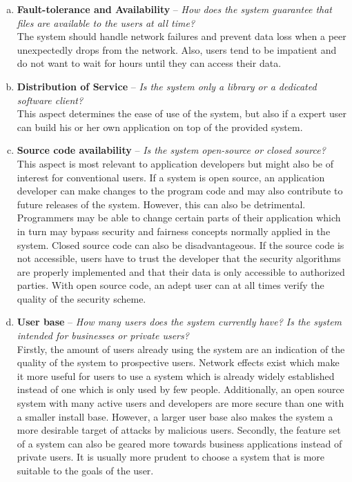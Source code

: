 \begin{enumerate}[(a)]
\item \textbf{Fault-tolerance and Availability} -- \textit{How does the system guarantee that files are available to the users at all time?}\\
The system should handle network failures and prevent data loss when a peer unexpectedly drops from the network. Also, users tend to be impatient and do not want to wait for hours until they can access their data.

\item \textbf{Distribution of Service} -- \textit{Is the system only a library or a dedicated software client?}\\
This aspect determines the ease of use of the system, but also if a expert user can build his or her own application on top of the provided system.

\item \textbf{Source code availability} -- \textit{Is the system open-source or closed source?}\\
This aspect is most relevant to application developers but might also be of interest for conventional users. If a system is open source, an application developer can make changes to the program code and may also contribute to future releases of the system. However, this can also be detrimental. Programmers may be able to change certain parts of their application which in turn may bypass security and fairness concepts normally applied in the system. Closed source code can also be disadvantageous. If the source code is not accessible, users have to trust the developer that the security algorithms are properly implemented and that their data is only accessible to authorized parties. With open source code, an adept user can at all times verify the quality of the security scheme.

\item \textbf{User base} -- \textit{How many users does the system currently have? Is the system intended for businesses or private users?}\\
Firstly, the amount of users already using the system are an indication of the quality of the system to prospective users. Network effects exist which make it more useful for users to use a system which is already widely established instead of one which is only used by few people. Additionally, an open source system with many active users and developers are more secure than one with a smaller install base. However, a larger user base also makes the system a more desirable target of attacks by malicious users. Secondly, the feature set of a system can also be geared more towards business applications instead of private users. It is usually more prudent to choose a system that is more suitable to the goals of the user.


\end{enumerate}
